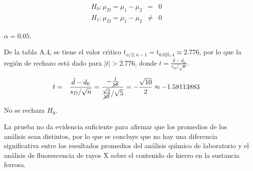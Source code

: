 \begin{solucion}
 \begin{hipotesis}
  \begin{eqnarray*}
   H_0: \mu_D = \mu_1 - \mu_2 &   =  & 0 \\
   H_1: \mu_D = \mu_1 - \mu_2 & \neq & 0
  \end{eqnarray*}
 \end{hipotesis}

 \begin{significancia}
  $\alpha = 0.05$.
 \end{significancia}

 \begin{region}
  De la tabla A.4, se tiene el valor cr\'{\i}tico
  $t_{\alpha/2,n-1} = t_{0.025,4} \approx 2.776$,
  por lo que la regi\'on de rechazo est\'a dado para $|t| > 2.776$,
  donde $t = \frac{\bar{d} - d_0}{s_D/\sqrt{n}}$.
 \end{region}

 \begin{estadistico}
  \begin{eqnarray*}
   t & = & \frac{\bar{d} - d_0}{s_D/\sqrt{n}}
   = \frac{
   -\frac{1}{\cancel{10}}
   }{
   \frac{\sqrt{2}}{\cancel{10}}/\sqrt{5}
   }
   = -\frac{\sqrt{10}}{2}
   \approx -1.58113883
  \end{eqnarray*}
 \end{estadistico}

 \begin{decision}
  No se rechaza $H_0$.
 \end{decision}

 \begin{conclusion}
  La prueba no da evidencia suficiente para afirmar
  que los promedios de los an\'alisis sean distintos,
  por lo que se concluye que no hay una diferencia significativa
  entre los resultados promedios del an\'alisis qu\'{\i}mico
  de laboratorio y el an\'alisis de fluorescencia de rayos X
  sobre el contenido de hierro en la sustancia ferrosa.
 \end{conclusion}


\end{solucion}
